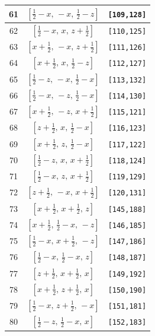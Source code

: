 \documentclass[fleqn,8pt]{jsarticle}
\begin{document}
\begin{longtable}{ccc}
61 & $\left[ \frac{1}{2} - x,\, - x,\, \frac{1}{2} - z \right]$ & {\tt [109,128]} \\ \hline
62 & $\left[ \frac{1}{2} - x,\, x,\, z + \frac{1}{2} \right]$ & {\tt [110,125]} \\ \hline
63 & $\left[ x + \frac{1}{2},\, - x,\, z + \frac{1}{2} \right]$ & {\tt [111,126]} \\ \hline
64 & $\left[ x + \frac{1}{2},\, x,\, \frac{1}{2} - z \right]$ & {\tt [112,127]} \\ \hline
65 & $\left[ \frac{1}{2} - z,\, - x,\, \frac{1}{2} - x \right]$ & {\tt [113,132]} \\ \hline
66 & $\left[ \frac{1}{2} - x,\, - z,\, \frac{1}{2} - x \right]$ & {\tt [114,130]} \\ \hline
67 & $\left[ x + \frac{1}{2},\, - z,\, x + \frac{1}{2} \right]$ & {\tt [115,121]} \\ \hline
68 & $\left[ z + \frac{1}{2},\, x,\, \frac{1}{2} - x \right]$ & {\tt [116,123]} \\ \hline
69 & $\left[ x + \frac{1}{2},\, z,\, \frac{1}{2} - x \right]$ & {\tt [117,122]} \\ \hline
70 & $\left[ \frac{1}{2} - z,\, x,\, x + \frac{1}{2} \right]$ & {\tt [118,124]} \\ \hline
71 & $\left[ \frac{1}{2} - x,\, z,\, x + \frac{1}{2} \right]$ & {\tt [119,129]} \\ \hline
72 & $\left[ z + \frac{1}{2},\, - x,\, x + \frac{1}{2} \right]$ & {\tt [120,131]} \\ \hline
73 & $\left[ x + \frac{1}{2},\, x + \frac{1}{2},\, z \right]$ & {\tt [145,188]} \\ \hline
74 & $\left[ x + \frac{1}{2},\, \frac{1}{2} - x,\, - z \right]$ & {\tt [146,185]} \\ \hline
75 & $\left[ \frac{1}{2} - x,\, x + \frac{1}{2},\, - z \right]$ & {\tt [147,186]} \\ \hline
76 & $\left[ \frac{1}{2} - x,\, \frac{1}{2} - x,\, z \right]$ & {\tt [148,187]} \\ \hline
77 & $\left[ z + \frac{1}{2},\, x + \frac{1}{2},\, x \right]$ & {\tt [149,192]} \\ \hline
78 & $\left[ x + \frac{1}{2},\, z + \frac{1}{2},\, x \right]$ & {\tt [150,190]} \\ \hline
79 & $\left[ \frac{1}{2} - x,\, z + \frac{1}{2},\, - x \right]$ & {\tt [151,181]} \\ \hline
80 & $\left[ \frac{1}{2} - z,\, \frac{1}{2} - x,\, x \right]$ & {\tt [152,183]} \\ \hline

\end{longtable}
\end{document}
